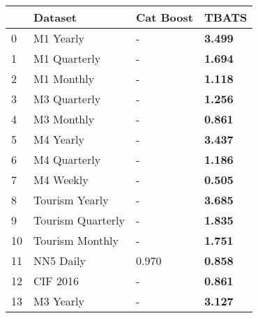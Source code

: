 \begin{tabular}{llll}
\toprule
 & Dataset & Cat Boost & TBATS \\
\midrule
0 & M1 Yearly & - & \textbf{3.499} \\
1 & M1 Quarterly & - & \textbf{1.694} \\
2 & M1 Monthly & - & \textbf{1.118} \\
3 & M3 Quarterly & - & \textbf{1.256} \\
4 & M3 Monthly & - & \textbf{0.861} \\
5 & M4 Yearly & - & \textbf{3.437} \\
6 & M4 Quarterly & - & \textbf{1.186} \\
7 & M4 Weekly & - & \textbf{0.505} \\
8 & Tourism Yearly & - & \textbf{3.685} \\
9 & Tourism Quarterly & - & \textbf{1.835} \\
10 & Tourism Monthly & - & \textbf{1.751} \\
11 & NN5 Daily & 0.970 & \textbf{0.858} \\
12 & CIF 2016 & - & \textbf{0.861} \\
13 & M3 Yearly & - & \textbf{3.127} \\
\bottomrule
\end{tabular}
